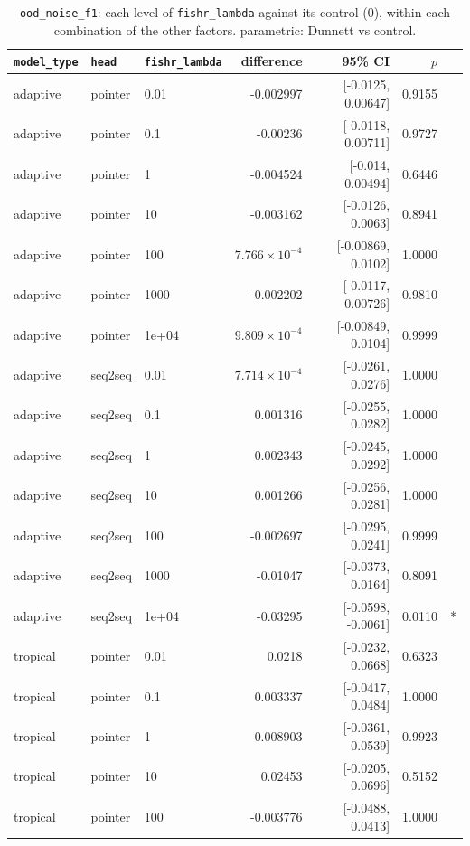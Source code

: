 \documentclass[10pt]{article}
\begin{document}
{\small
\begin{longtable}{lllrrrl}
\caption{\texttt{ood\_noise\_f1}: each level of \texttt{fishr\_lambda} against its control (0), within each combination of the other factors. parametric: Dunnett vs control.}\label{tab:control-ood_noise_f1}\\
\toprule
\texttt{model\_type} & \texttt{head} & \texttt{fishr\_lambda} & difference & 95\% CI & $p$ & \\
\midrule
\endhead
adaptive & pointer & 0.01 & -0.002997 & [-0.0125, 0.00647] & 0.9155 & \\
adaptive & pointer & 0.1 & -0.00236 & [-0.0118, 0.00711] & 0.9727 & \\
adaptive & pointer & 1 & -0.004524 & [-0.014, 0.00494] & 0.6446 & \\
adaptive & pointer & 10 & -0.003162 & [-0.0126, 0.0063] & 0.8941 & \\
adaptive & pointer & 100 & $7.766\times10^{-4}$ & [-0.00869, 0.0102] & 1.0000 & \\
adaptive & pointer & 1000 & -0.002202 & [-0.0117, 0.00726] & 0.9810 & \\
adaptive & pointer & 1e+04 & $9.809\times10^{-4}$ & [-0.00849, 0.0104] & 0.9999 & \\
adaptive & seq2seq & 0.01 & $7.714\times10^{-4}$ & [-0.0261, 0.0276] & 1.0000 & \\
adaptive & seq2seq & 0.1 & 0.001316 & [-0.0255, 0.0282] & 1.0000 & \\
adaptive & seq2seq & 1 & 0.002343 & [-0.0245, 0.0292] & 1.0000 & \\
adaptive & seq2seq & 10 & 0.001266 & [-0.0256, 0.0281] & 1.0000 & \\
adaptive & seq2seq & 100 & -0.002697 & [-0.0295, 0.0241] & 0.9999 & \\
adaptive & seq2seq & 1000 & -0.01047 & [-0.0373, 0.0164] & 0.8091 & \\
adaptive & seq2seq & 1e+04 & -0.03295 & [-0.0598, -0.0061] & 0.0110 & *\\
tropical & pointer & 0.01 & 0.0218 & [-0.0232, 0.0668] & 0.6323 & \\
tropical & pointer & 0.1 & 0.003337 & [-0.0417, 0.0484] & 1.0000 & \\
tropical & pointer & 1 & 0.008903 & [-0.0361, 0.0539] & 0.9923 & \\
tropical & pointer & 10 & 0.02453 & [-0.0205, 0.0696] & 0.5152 & \\
tropical & pointer & 100 & -0.003776 & [-0.0488, 0.0413] & 1.0000 & \\

\end{longtable}}
\end{document}

